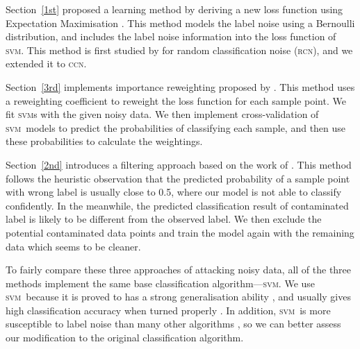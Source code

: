 \documentclass[12pt]{article} %
\newcommand{\svm}{\textsc{svm}}
\begin{document}

Section~\ref{1st} proposed a learning method by deriving a new loss function using Expectation Maximisation \citep[p.423]{Bishop:2006:PRM:1162264}. This method models the label noise using a Bernoulli distribution, and includes the label noise information into the loss function of \svm. This method is first studied by \citet{pmlr-v20-biggio11} for random classification noise (\textsc{rcn}), and we extended it to \textsc{ccn}.

Section~\ref{3rd} implements importance reweighting proposed by \citet{liu2016classification}. This method uses a reweighting coefficient to reweight the loss function for each sample point. We fit \svm s with the given noisy data. We then implement cross-validation of \svm\ models to predict the probabilities of classifying each sample, and then use these probabilities to calculate the weightings.

Section~\ref{2nd} introduces a filtering approach based on the work of \citet{brodley1996identifying}. This method follows the heuristic observation that the predicted probability of a sample point with wrong label is usually close to 0.5, where our model is not able to classify confidently. In the meanwhile, the predicted classification result of contaminated label is likely to be different from the observed label.  We then exclude the potential contaminated data points and train the model again with the remaining data which seems to be cleaner.

To fairly compare these three approaches of attacking noisy data, all of the three methods implement the same base classification algorithm---\svm. We use \svm\ because it is proved to has a strong generalisation ability \citep{NIPS2012_4500,Seeger:2003:PGE:944919.944929,Cortes1995}, and usually gives high classification accuracy when turned properly \citep{Fernandez-Delgado:2014:WNH:2627435.2697065}. In addition, \svm\ is more susceptible to label noise than many other algorithms \citep{frenay2014classification}, so we can better assess our modification to the original classification algorithm.
\end{document}
